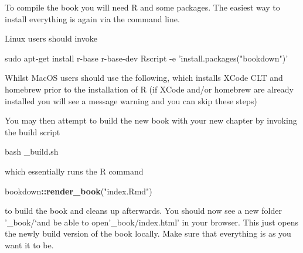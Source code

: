 \documentclass[]{book}
\newenvironment{Shaded}{\begin{snugshade}}{\end{snugshade}}
\newcommand{\KeywordTok}[1]{\textcolor[rgb]{0.13,0.29,0.53}{\textbf{#1}}}
\newcommand{\StringTok}[1]{\textcolor[rgb]{0.31,0.60,0.02}{#1}}
\newcommand{\FunctionTok}[1]{\textcolor[rgb]{0.00,0.00,0.00}{#1}}
\newcommand{\VariableTok}[1]{\textcolor[rgb]{0.00,0.00,0.00}{#1}}
\newcommand{\OperatorTok}[1]{\textcolor[rgb]{0.81,0.36,0.00}{\textbf{#1}}}
\newcommand{\ExtensionTok}[1]{#1}
\newcommand{\NormalTok}[1]{#1}
\begin{document}
To compile the book you will need R and some packages. The easiest way
to install everything is again via the command line.

Linux users should invoke

\begin{Shaded}
\begin{Highlighting}[]
\FunctionTok{sudo}\NormalTok{ apt-get install r-base r-base-dev }
\ExtensionTok{Rscript}\NormalTok{ -e }\StringTok{'install.packages("bookdown")'}
\end{Highlighting}
\end{Shaded}

Whilst MacOS users should use the following, which installs XCode CLT
and homebrew prior to the installation of R (if XCode and/or homebrew
are already installed you will see a message warning and you can skip
these steps)

\begin{Shaded}
\end{Shaded}

You may then attempt to build the new book with your new chapter by
invoking the build script

\begin{Shaded}
\begin{Highlighting}[]
\FunctionTok{bash}\NormalTok{ _build.sh}
\end{Highlighting}
\end{Shaded}

which essentially runs the R command

\begin{Shaded}
\begin{Highlighting}[]
\NormalTok{bookdown}\OperatorTok{::}\KeywordTok{render_book}\NormalTok{(}\StringTok{"index.Rmd"}\NormalTok{)}
\end{Highlighting}
\end{Shaded}

to build the book and cleans up afterwards. You should now see a new
folder '\_book/`and be able to open'\_book/index.html' in your browser.
This just opens the newly build version of the book locally. Make sure
that everything is as you want it to be.
\end{document}

